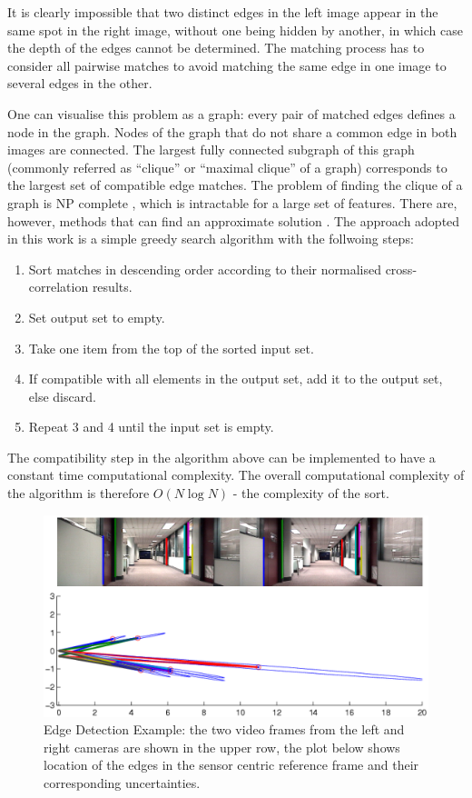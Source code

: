 It is clearly impossible that two distinct edges in the left image
appear in the same spot in the right image, without one being hidden
by another, in which case the depth of the edges cannot be
determined. The matching process has to consider all pairwise matches
to avoid matching the same edge in one image to several edges in the
other.

One can visualise this problem as a graph: every pair of matched edges
defines a node in the graph. Nodes of the graph that do not share a
common edge in both images are connected. The largest fully connected
subgraph of this graph (commonly referred as ``clique'' or ``maximal
clique'' of a graph) corresponds to the largest set of compatible edge
matches. The problem of finding the clique of a graph is NP complete
\cite{cook1971ctp}, which is intractable for a large set of
features. There are, however, methods that can find an approximate
solution \cite{balas1986fmc,pardalos1994mcp}. The approach adopted in
this work is a simple greedy search algorithm with the follwoing steps:

\begin{enumerate}
\item Sort matches in descending order according to their normalised
  cross-correlation results.
\item Set output set to empty.
\item Take one item from the top of the sorted input set.
\item If compatible with all elements in the output set, add it to the
  output set, else discard.
\item Repeat 3 and 4 until the input set is empty.
\end{enumerate}

The compatibility step in the algorithm above can be implemented to
have a constant time computational complexity. The overall
computational complexity of the algorithm is therefore $O(N \log N)$ -
the complexity of the sort.

\begin{figure}[htbp]
  \centering
  \includegraphics[width=13cm]{Pics/example_edge_detector}
  \caption[Edge Detection Example]{Edge Detection Example: the two
    video frames from the left and right cameras are shown in the
    upper row, the plot below shows location of the edges in the
    sensor centric reference frame and their corresponding
    uncertainties.}
  \label{fig:example_edge_detector}
\end{figure}


